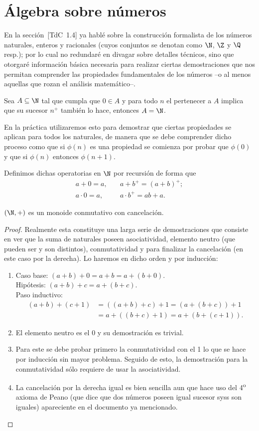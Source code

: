 \documentclass[11pt,oneside]{book}
\begin{document}
\section{Álgebra sobre números}
En la sección~[TdC~1.4] ya hablé sobre la construcción formalista de los números naturales, enteros y racionales (cuyos conjuntos se denotan como $\N$, $\Z$ y $\Q$ resp.); por lo cual no redundaré en divagar sobre detalles técnicos, sino que otorgaré información básica necesaria para realizar ciertas demostraciones que nos permitan comprender las propiedades fundamentales de los números --o al menos aquellas que rozan el análisis matemático--.
\begin{mydef}
Sea $A\subseteq\N$ tal que cumpla que $0\in A$ y para todo $n$ el pertenecer a $A$ implica que su sucesor $n^+$ también lo hace, entonces $A=\N$. 
\end{mydef}
En la práctica utilizaremos esto para demostrar que ciertas propiedades se aplican para todos los naturales, de manera que se debe comprender dicho proceso como que si $\phi(n)$ es una propiedad se comienza por probar que $\phi(0)$ y que si $\phi(n)$ entonces $\phi(n+1)$.
\begin{mydef}
Definimos dichas operatorias en $\N$ por recursión de forma que
\begin{align*}
a+0=a,&\quad a+b^+=(a+b)^+;\\
a\cdot 0=a,&\quad a\cdot b^+=ab+a.
\end{align*}
\end{mydef}
\begin{thm}
$(\N,+)$ es un monoide conmutativo con cancelación.
\end{thm}
\begin{proof}
Realmente esta constituye una larga serie de demostraciones que consiste en ver que la suma de naturales poseen asociatividad, elemento neutro (que pueden ser y son distintos), conmutatividad y para finalizar la cancelación (en este caso por la derecha). Lo haremos en dicho orden y por inducción:
\begin{enumerate}[$a)$]
	\item Caso base: $(a+b)+0=a+b=a+(b+0)$.\\
	Hipótesis: $(a+b)+c=a+(b+c)$.\\
	Paso inductivo:
	\begin{align*}
	(a+b)+(c+1)&=((a+b)+c)+1=(a+(b+c))+1\\
	&=a+((b+c)+1)=a+(b+(c+1)).
	\end{align*}
	\item El elemento neutro es el 0 y su demostración es trivial.
	\item Para este se debe probar primero la conmutatividad con el 1 lo que se hace por inducción sin mayor problema. Seguido de esto, la demostración para la conmutatividad sólo requiere de usar la asociatividad.
	\item La cancelación por la derecha igual es bien sencilla aun que hace uso del 4\textsuperscript{o} axioma de Peano (que dice que dos números poseen igual sucesor syss son iguales) apareciente en el documento ya mencionado.
\end{enumerate}
\end{proof}
\end{document}
